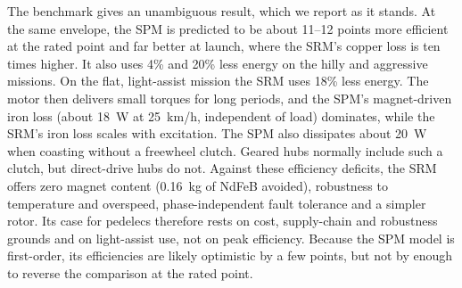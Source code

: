 \documentclass[journal]{IEEEtran}
\begin{document}
\begin{table}[!t]
\caption{Equal-Envelope Benchmark: Analytic SPM Versus SRM}
\label{tab:pm}
\centering
\renewcommand{\arraystretch}{1.08}
\setlength{\tabcolsep}{3pt}
\end{table}

The benchmark gives an unambiguous result, which we report as it stands. At the
same envelope, the SPM is predicted to be about 11--12 points more efficient at
the rated point and far better at launch, where the SRM's copper loss is ten
times higher. It also uses 4\% and 20\% less energy on the hilly and
aggressive missions. On the flat, light-assist mission the SRM uses 18\% less
energy. The motor then delivers small torques for long periods, and the
SPM's magnet-driven iron loss (about 18~W at 25~km/h, independent of load)
dominates, while the SRM's iron loss scales with excitation. The SPM also
dissipates about 20~W when coasting without a freewheel clutch. Geared hubs
normally include such a clutch, but direct-drive hubs do not. Against these
efficiency deficits, the SRM offers zero magnet content (0.16~kg of NdFeB
avoided), robustness to temperature and overspeed, phase-independent fault
tolerance and a simpler rotor. Its case for pedelecs therefore rests on cost,
supply-chain and robustness grounds and on light-assist use, not on peak
efficiency. Because the SPM model is first-order, its efficiencies are likely
optimistic by a few points, but not by enough to reverse the comparison at the
rated point.
\end{document}
